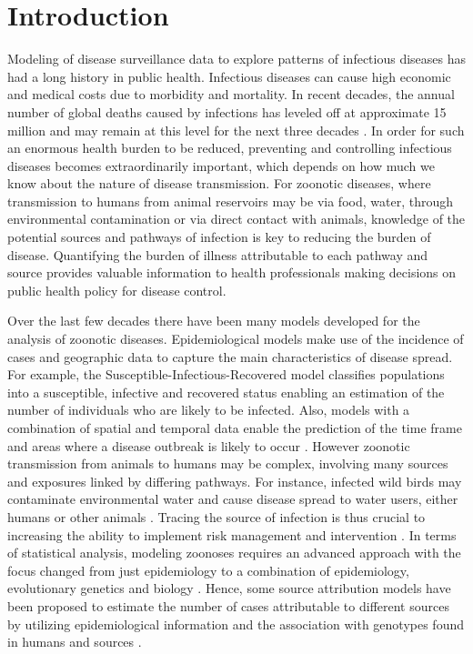 \documentclass[times, doublespace]{simauth}%
\begin{document}
\section{Introduction}
Modeling of disease surveillance data to explore patterns of infectious diseases has had a long history in public health. Infectious diseases can cause high economic and medical costs due to morbidity and mortality. In recent decades, the annual number of global deaths caused by infections has leveled off at approximate 15 million and may remain at this level for the next three decades \cite{DyeC, WHOM}. In order for such an enormous health burden to be reduced, preventing and controlling infectious diseases becomes extraordinarily important, which depends on how much we know about the nature of disease transmission. For zoonotic diseases, where transmission to humans from animal reservoirs may be via food, water, through environmental contamination or via direct contact with animals, knowledge of the potential sources and pathways of infection is key to reducing the burden of disease. Quantifying the burden of illness attributable to each pathway and source provides valuable information to health professionals making decisions on public health policy for disease control.

Over the last few decades there have been many models developed for the analysis of zoonotic diseases. Epidemiological models make use of the incidence of cases and geographic data to capture the main characteristics of disease spread. For example, the Susceptible-Infectious-Recovered model \cite{Kerm} classifies populations into a susceptible, infective and recovered status enabling an estimation of the number of individuals who are likely to be infected. Also, models with a combination of spatial and temporal data enable the prediction of the time frame and areas where a disease outbreak is likely to occur \cite{HeldL, Hoehl, Simo}. However zoonotic transmission from animals to humans may be complex, involving many sources and exposures linked by differing pathways. For instance, infected wild birds may contaminate environmental water and cause disease spread to water users, either humans or other animals \cite{Wagen}. Tracing the source of infection is thus crucial to increasing the ability to implement risk management and intervention \cite{Wilso, Morel}. In terms of statistical analysis, modeling zoonoses requires an advanced approach with the focus changed from just epidemiology to a combination of epidemiology, evolutionary genetics and biology \cite{Muell}. Hence, some source attribution models have been proposed to estimate the number of cases attributable to different sources by utilizing epidemiological information and the association with genotypes found in humans and sources \cite{vanP, Hald, MullA}.
\end{document}

